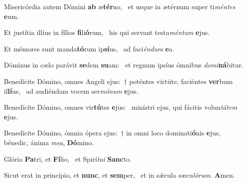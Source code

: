 \item Misericórdia autem Dómini \textbf{ab} æ\textbf{tér}no,~\psstar{} et usque in ætérnum super ti\textit{méntes} \textbf{e}um.
\item Et justítia illíus in fílios \textbf{fi}li\textbf{ó}rum,~\psstar{} his qui servant testa\textit{méntum} \textbf{e}jus.
\item Et mémores sunt manda\textbf{tó}rum ip\textbf{sí}us,~\psstar{} ad faci\textit{éndum} \textbf{e}a.
\item Dóminus in cælo parávit \textbf{se}dem \textbf{su}am:~\psstar{} et regnum ipsíus ómnibus \textit{domi}\textbf{ná}bitur.
\item Benedícite Dómino, omnes Angeli ejus:~† poténtes virtúte, faciéntes \textbf{ver}bum il\textbf{lí}us,~\psstar{} ad audiéndam vocem ser\textit{mónum} \textbf{e}jus.
\item Benedícite Dómino, omnes vir\textbf{tú}tes \textbf{e}jus:~\psstar{} minístri ejus, qui fácitis volun\textit{tátem} \textbf{e}jus.
\item Benedícite Dómino, ómnia ópera ejus:~† in omni loco dominati\textbf{ó}nis \textbf{e}jus,~\psstar{} bénedic, ánima \textit{mea}, \textbf{Dó}mino.
\item Glória \textbf{Pa}tri, et \textbf{Fí}lio,~\psstar{} et Spirí\textit{tui} \textbf{Sanc}to.
\item Sicut erat in princípio, et \textbf{nunc}, et \textbf{sem}per,~\psstar{} et in sǽcula sæcu\textit{lórum}. \textbf{A}men.
